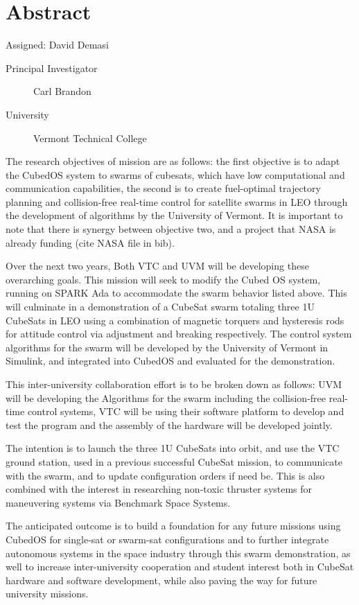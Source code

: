 \section{Abstract}
Assigned: David Demasi \cite{brandon:2008}

\begin{description}
\item[Principal Investigator] Carl Brandon
\item[University] Vermont Technical College
\end{description}

The research objectives of mission are as follows:  the first objective is to adapt the CubedOS system to swarms of cubesats, which have low computational and communication capabilities, the second is to create fuel-optimal trajectory planning and collision-free real-time control for satellite swarms in LEO through the development of algorithms by the University of Vermont. It is important to note that there is synergy between objective two, and a project that NASA is already funding (cite NASA file in bib).

Over the next two years, Both VTC and UVM will be developing these overarching goals. This mission will seek to modify the Cubed OS system, running on SPARK Ada to accommodate the swarm behavior listed above. This will culminate in a demonstration of a CubeSat swarm totaling three 1U CubeSats in LEO using a combination of magnetic torquers and hysteresis rods for attitude control via adjustment and breaking respectively. The control system algorithms for the swarm will be developed by the University of Vermont in Simulink, and integrated into CubedOS and evaluated for the demonstration.

This inter-university collaboration effort is to be broken down as follows: UVM will be developing the Algorithms for the swarm including the collision-free real-time control systems, VTC will be using their software platform to develop and test the program and the assembly of the hardware will be developed jointly.

The intention is to launch the three 1U CubeSats into orbit, and use the VTC ground station, used in a previous successful CubeSat mission, to communicate with the swarm, and to update configuration orders if need be. This is also combined with the interest in researching non-toxic thruster systems for maneuvering systems via Benchmark Space Systems.
	
The anticipated outcome is to build a foundation for any future missions using CubedOS for single-sat or swarm-sat configurations and to further integrate autonomous systems in the space industry through this swarm demonstration, as well to increase inter-university cooperation and student interest both in CubeSat hardware and software development, while also paving the way for future university missions.
	

